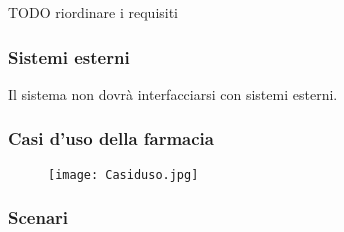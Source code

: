 TODO riordinare i requisiti

\subsubsection{Sistemi esterni}
\label{sec:esterno}

Il sistema non dovrà interfacciarsi con sistemi esterni.


\newpage %
\subsubsection{Casi d'uso della farmacia}

\begin{figure}[h!]
  \begin{center}
    \texttt{[image: Casiduso.jpg]}
  \end{center}
\end{figure}

\newpage %
\subsubsection{Scenari}
\hfill \break

